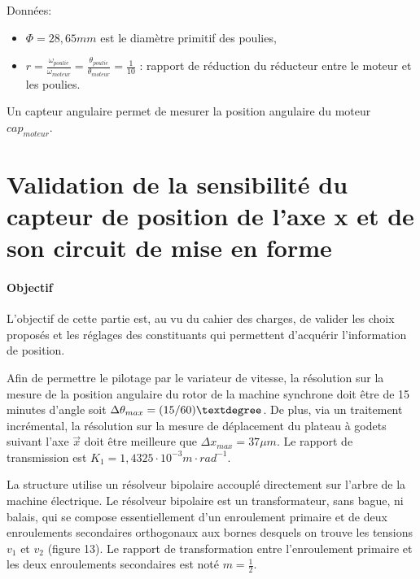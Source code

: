\newpage

Données:
\begin{itemize}
 \item $\Phi=28,65mm$ est le diamètre primitif des poulies,
 \item $r=\frac{\omega_{poulie}}{\omega_{moteur}}=\frac{\theta_{poulie}}{\theta_{moteur}}=\frac{1}{10}$ : rapport de réduction du réducteur entre le moteur et les poulies.
\end{itemize}

Un capteur angulaire permet de mesurer la position angulaire du moteur $cap_{moteur}$.



\section{Validation de la sensibilité du capteur de position de l’axe x et de son circuit de mise en forme}

\paragraph{Objectif}

L’objectif de cette partie est, au vu du cahier des charges, de valider les choix proposés et les réglages des constituants qui permettent d’acquérir l’information de position.

Afin de permettre le pilotage par le variateur de vitesse, la résolution sur la mesure de la position angulaire du rotor de la machine synchrone doit être de 15 minutes d’angle soit $\Delta\theta_{max} = (15/60)\textdegree$. De plus, via un traitement
incrémental, la résolution sur la mesure de déplacement du plateau à godets suivant l’axe $\overrightarrow{x}$ doit être meilleure que $\Delta x_{max} = 37 \mu m$. Le rapport de transmission est $K_1 = 1,4325\cdot 10^{-3} m\cdot rad^{-1}$.

La structure utilise un résolveur bipolaire accouplé directement sur l’arbre de la machine électrique. Le résolveur bipolaire est un transformateur, sans bague, ni balais, qui se compose essentiellement d’un enroulement primaire et de deux enroulements secondaires orthogonaux aux bornes desquels on trouve les tensions $v_1$ et $v_2$ (figure 13). Le rapport de transformation entre l’enroulement primaire et les deux enroulements secondaires est noté $m = \frac{1}{2}$.


